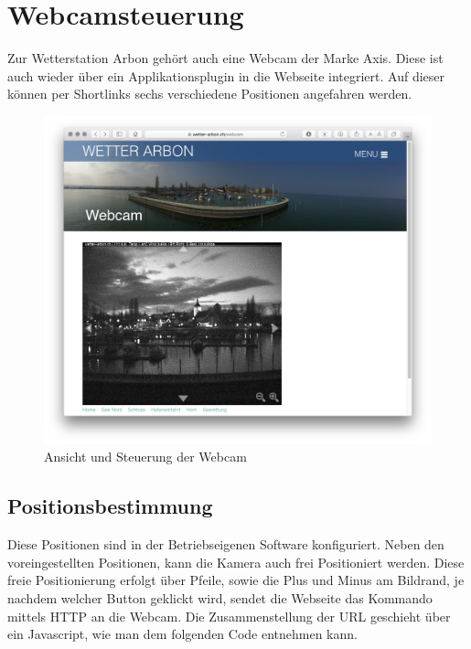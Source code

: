\section{Webcamsteuerung}
Zur Wetterstation Arbon gehört auch eine Webcam der Marke Axis. Diese ist auch wieder über ein Applikationsplugin in die Webseite integriert. Auf dieser können per Shortlinks sechs verschiedene Positionen angefahren werden.

\begin{figure}[h]
	\centering
	\includegraphics[width=1\linewidth]{img/webcam-seite}
	\caption{Ansicht und Steuerung der Webcam}
	\label{img:webcam-seite}
\end{figure}


\subsection{Positionsbestimmung}
Diese Positionen sind in der Betriebseigenen Software konfiguriert. Neben den voreingestellten Positionen, kann die Kamera auch frei Positioniert werden. Diese freie Positionierung erfolgt über Pfeile, sowie die Plus und Minus am Bildrand, je nachdem welcher Button geklickt wird, sendet die Webseite das Kommando mittels HTTP an die Webcam. Die Zusammenstellung der URL geschieht über ein Javascript, wie man dem folgenden Code entnehmen kann.


